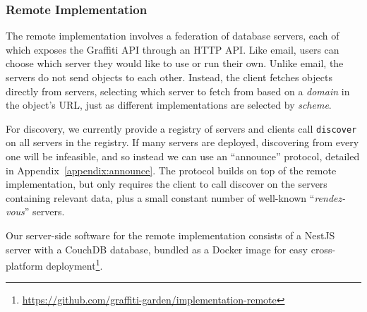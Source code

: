 
\subsubsection{Remote Implementation}
\label{above-and-below:remote-protocol}

The remote implementation involves a federation of database servers,
each of which exposes the Graffiti API through an HTTP API.
Like email, users can choose which server they would
like to use or run their own.
Unlike email, the servers do not send objects to each other.
Instead, the client fetches objects directly from servers,
selecting which server to fetch from based on a \emph{domain}
in the object's URL, just as different implementations are selected by \emph{scheme}.

For discovery, we currently provide a registry of servers
and clients call \texttt{discover} on all servers in the registry.
If many servers are deployed, discovering from every one
will be infeasible, and so instead we can use an ``announce''
protocol, detailed in Appendix~\ref{appendix:announce}. The protocol builds on top of the remote implementation,
but only requires the client to
call discover on the servers containing relevant data,
plus a small constant number of well-known
``\emph{rendez-vous}'' servers.

Our server-side software for the remote implementation
consists of a NestJS server with a CouchDB database,
bundled as a Docker image for easy cross-platform
deployment\footnote{
\url{https://github.com/graffiti-garden/implementation-remote}
}.



